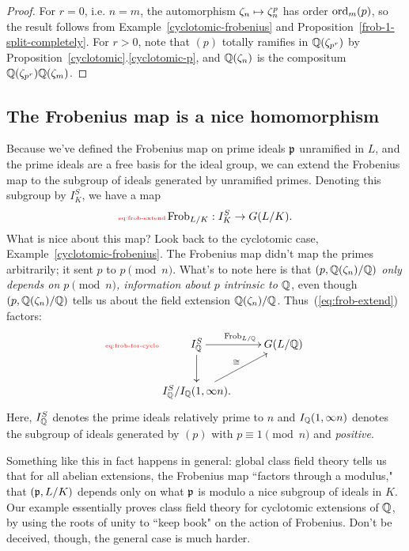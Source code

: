 \begin{proof}
For $r=0$, i.e. $n=m$, the automorphism $\zeta_n\mapsto \zeta_n^p$ has order $\operatorname{ord}_m(p)$, so the result follows from Example~\ref{cyclotomic-frobenius} and Proposition~\ref{frob-1-split-completely}. For $r>0$, note that $(p)$ totally ramifies in $\mathbb{Q}(\zeta_{p^r})$ by Proposition~\ref{cyclotomic}.\ref{cyclotomic-p}, and $\mathbb{Q}(\zeta_{n})$ is the compositum $\mathbb{Q}(\zeta_{p^r})\mathbb{Q}(\zeta_m)$.
\end{proof}

\subsection{The Frobenius map is a nice homomorphism}
Because we've defined the Frobenius map on prime ideals $\mathfrak{p}$ unramified in $L$, and the prime ideals are a free basis for the ideal group, we can extend the Frobenius map to the subgroup of ideals generated by unramified primes. Denoting this subgroup by $I_K^S$, we have a map
\begin{equation}\llabel{eq:frob-extend}
\Frob_{L/K}:I_K^S\to G(L/K).
\end{equation}
What is nice about this map? Look back to the cyclotomic case, Example~\ref{cyclotomic-frobenius}. The Frobenius map didn't map the primes arbitrarily; it sent $p$ to $p\pmod n$. What's to note here is that {\it $(p,\mathbb{Q}(\zeta_n)/\mathbb{Q})$ only depends on $p\pmod n$, information about $p$ intrinsic to $\mathbb{Q}$}, even though $(p,\mathbb{Q}(\zeta_n)/\mathbb{Q})$ tells us about the field extension $\mathbb{Q}(\zeta_n)/\mathbb{Q}$. Thus~(\ref{eq:frob-extend}) factors:
\begin{equation}\llabel{eq:frob-for-cyclo}
\xymatrix{
I_{\Q}^S\ar[r]^{\Frob_{L/\Q}} \ar[d] & G(L/\Q)\\
I_{\Q}^S/I_{\Q}(1, \iy n).\ar[ur]^{\cong}}
\end{equation}
Here, $I_{\mathbb{Q}}^S$ denotes the prime ideals relatively prime to $n$ and $I_{\mathbb{Q}}(1, \infty n)$ denotes the subgroup of ideals generated by $(p)$ with $p\equiv 1\pmod n$ and {\it positive}.

Something like this in fact happens in general: global class field theory tells us that for all abelian extensions, the Frobenius map ``factors through a modulus," that $(\mathfrak{p},L/K)$ depends only on what $\mathfrak{p}$ is modulo a nice subgroup of ideals in $K$. Our example essentially proves class field theory for cyclotomic extensions of $\mathbb{Q}$, by using the roots of unity to ``keep book" on the action of Frobenius. Don't be deceived, though, the general case is much harder.

